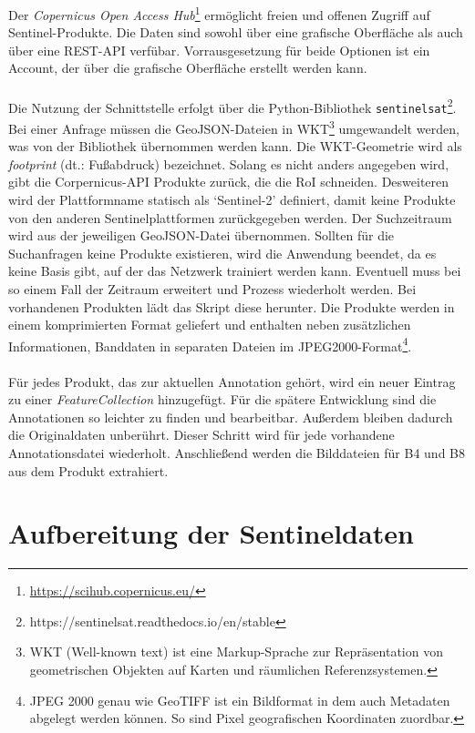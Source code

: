 Der \textit{Copernicus Open Access Hub}\footnote{\url{https://scihub.copernicus.eu/}} ermöglicht freien und offenen Zugriff auf Sentinel-Produkte. Die Daten sind sowohl über eine grafische Oberfläche als auch über eine REST-API verfübar. Vorrausgesetzung für beide Optionen ist ein Account, der über die grafische Oberfläche erstellt werden kann.
\\\\
Die Nutzung der Schnittstelle erfolgt über die Python-Bibliothek \texttt{sentinelsat}\footnote{https://sentinelsat.readthedocs.io/en/stable}. Bei einer Anfrage müssen die GeoJSON-Dateien in WKT\footnote{WKT (Well-known text) ist eine Markup-Sprache zur Repräsentation von geometrischen Objekten auf Karten und räumlichen Referenzsystemen.} umgewandelt werden, was von der Bibliothek übernommen werden kann. Die WKT-Geometrie wird als \textit{footprint} (dt.: Fußabdruck) bezeichnet. Solang es nicht anders angegeben wird, gibt die Corpernicus-API Produkte zurück, die die RoI schneiden. Desweiteren wird der Plattformname statisch als `Sentinel-2' definiert, damit keine Produkte von den anderen Sentinelplattformen zurückgegeben werden. Der Suchzeitraum wird aus der jeweiligen GeoJSON-Datei übernommen. Sollten für die Suchanfragen keine Produkte existieren, wird die Anwendung beendet, da es keine Basis gibt, auf der das Netzwerk trainiert werden kann. Eventuell muss bei so einem Fall der Zeitraum erweitert und Prozess wiederholt werden. Bei vorhandenen Produkten lädt das Skript diese herunter. Die Produkte werden in einem komprimierten Format geliefert und enthalten neben zusätzlichen Informationen, Banddaten in separaten Dateien im JPEG2000-Format\footnote{JPEG 2000 genau wie GeoTIFF ist ein Bildformat in dem auch Metadaten abgelegt werden können. So sind Pixel geografischen Koordinaten zuordbar.}.
\\\\
Für jedes Produkt, das zur aktuellen Annotation gehört, wird ein neuer Eintrag zu einer \textit{FeatureCollection} hinzugefügt. Für die spätere Entwicklung sind die Annotationen so leichter zu finden und bearbeitbar. Außerdem bleiben dadurch die Originaldaten unberührt. Dieser Schritt wird für jede vorhandene Annotationsdatei wiederholt. Anschließend werden die Bilddateien für B4 und B8 aus dem Produkt extrahiert.

\section{Aufbereitung der Sentineldaten}

